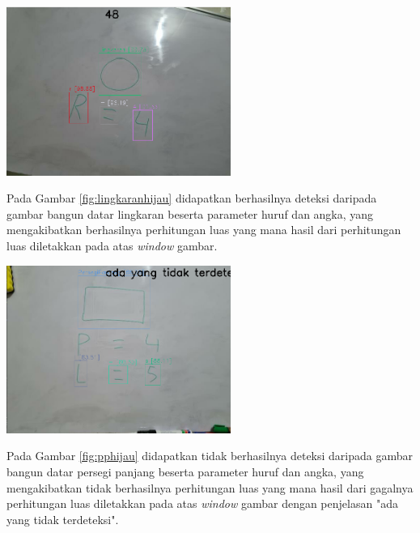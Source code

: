 \begin{center}
	\includegraphics[width=0.55\textwidth]{gambar/lingkaran hijau.png}
	\label{fig:lingkaranhijau}
\end{center}
Pada Gambar \ref{fig:lingkaranhijau} didapatkan berhasilnya deteksi daripada gambar bangun datar lingkaran beserta parameter huruf dan angka, yang mengakibatkan berhasilnya perhitungan luas yang mana hasil dari perhitungan luas diletakkan pada atas \textit{window} gambar.

\begin{center}
	\includegraphics[width=0.55\textwidth]{gambar/persegipanjang hijau.png}
	\label{fig:pphijau}
\end{center}
Pada Gambar \ref{fig:pphijau} didapatkan tidak berhasilnya deteksi daripada gambar bangun datar persegi panjang beserta parameter huruf dan angka, yang mengakibatkan tidak berhasilnya perhitungan luas yang mana hasil dari gagalnya perhitungan luas diletakkan pada atas \textit{window} gambar dengan penjelasan "ada yang tidak terdeteksi".

